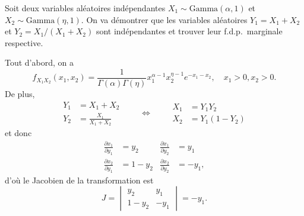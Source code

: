 \begin{exemple}
  \label{ex:transformations:gamma}
  Soit deux variables aléatoires indépendantes $X_1 \sim
  \text{Gamma}(\alpha, 1)$ et $X_2 \sim \text{Gamma}(\eta, 1)$. On va
  démontrer que les variables aléatoires $Y_1 = X_1 + X_2$ et $Y_2 =
  X_1/(X_1 + X_2)$ sont indépendantes et trouver leur f.d.p.\
  marginale respective.

  Tout d'abord, on a
  \begin{displaymath}
    f_{X_1 X_2}(x_1, x_2) = \frac{1}{\Gamma(\alpha) \Gamma(\eta)}
    x_1^{\alpha - 1} x_2^{\eta - 1} e^{-x_1 - x_2}, \quad
    x_1 > 0, x_2 > 0.
  \end{displaymath}
  De plus,
  \begin{displaymath}
    \begin{aligned}
      Y_1 &= X_1 + X_2 \\
      Y_2 &= \frac{X_1}{X_1 + X_2}
    \end{aligned}
    \qquad \Leftrightarrow \qquad
    \begin{aligned}
      X_1 &= Y_1 Y_2 \\
      X_2 &= Y_1(1 - Y_2)
    \end{aligned}
  \end{displaymath}
  et donc
  \begin{align*}
    \frac{\partial x_1}{\partial y_1} &= y_2 &
    \frac{\partial x_1}{\partial y_2} &= y_1 \\
    \frac{\partial x_2}{\partial y_1} &= 1 - y_2 &
    \frac{\partial x_2}{\partial y_2} &= - y_1,
  \end{align*}
  d'où le Jacobien de la transformation est
  \begin{displaymath}
    J =
    \begin{vmatrix}
      y_2 & y_1 \\
      1 - y_2 & -y_1
    \end{vmatrix}
    = - y_1.
  \end{displaymath}


\end{exemple}
